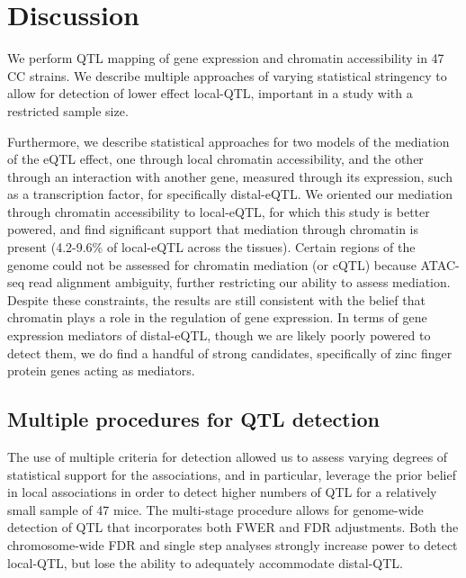 \section{Discussion}

We perform QTL mapping of gene expression and chromatin accessibility in 47 CC strains. We describe multiple approaches of varying statistical stringency to allow for detection of lower effect local-QTL, important in a study with a restricted sample size. 

Furthermore, we describe statistical approaches for two models of the mediation of the eQTL effect, one through local chromatin accessibility, and the other through an interaction with another gene, measured through its expression, such as a transcription factor, for specifically distal-eQTL. We oriented our mediation through chromatin accessibility to local-eQTL, for which this study is better powered, and find significant support that mediation through chromatin is present (4.2-9.6\% of local-eQTL across the tissues). Certain regions of the genome could not be assessed for chromatin mediation (or cQTL) because ATAC-seq read alignment ambiguity, further restricting our ability to assess mediation. Despite these constraints, the results are still consistent with the belief that chromatin plays a role in the regulation of gene expression. In terms of gene expression mediators of distal-eQTL, though we are likely poorly powered to detect them, we do find a handful of strong candidates, specifically of zinc finger protein genes acting as mediators. 

\subsection{Multiple procedures for QTL detection}

The use of multiple criteria for detection allowed us to assess varying degrees of statistical support for the associations, and in particular, leverage the prior belief in local associations in order to detect higher numbers of QTL for a relatively small sample of 47 mice. The multi-stage procedure allows for genome-wide detection of QTL that incorporates both FWER and FDR adjustments. Both the chromosome-wide FDR and single step analyses strongly increase power to detect local-QTL, but lose the ability to adequately accommodate distal-QTL.


